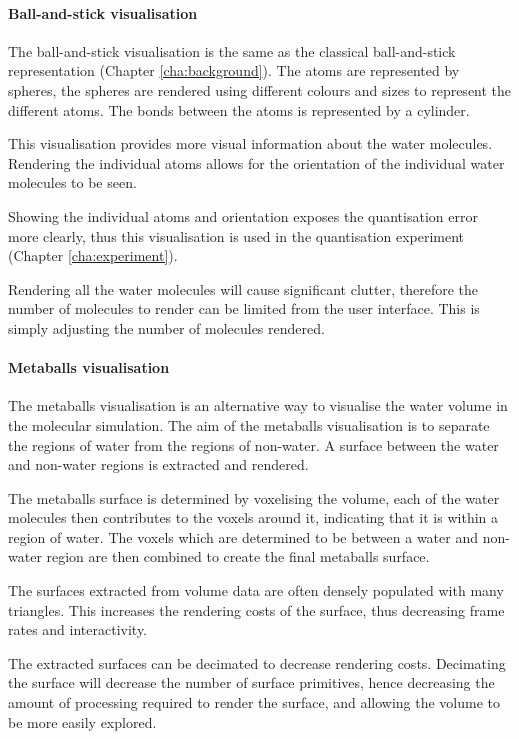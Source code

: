 
\paragraph{Ball-and-stick visualisation}

The ball-and-stick visualisation is the same as the classical ball-and-stick
representation (Chapter \ref{cha:background}). The atoms are represented by
spheres, the spheres are rendered using different colours and sizes to
represent the different atoms. The bonds between the atoms is represented by a
cylinder.

This visualisation provides more visual information about the water molecules.
Rendering the individual atoms allows for the orientation of the individual
water molecules to be seen.

Showing the individual atoms and orientation exposes the quantisation error
more clearly, thus this visualisation is used in the quantisation experiment
(Chapter \ref{cha:experiment}).

Rendering all the water molecules will cause significant clutter, therefore the
number of molecules to render can be limited from the user interface. This is
simply adjusting the number of molecules rendered.


\paragraph{Metaballs visualisation}

The metaballs visualisation is an alternative way to visualise the water volume
in the molecular simulation. The aim of the metaballs visualisation is to
separate the regions of water from the regions of non-water. A surface between
the water and non-water regions is extracted and rendered.

The metaballs surface is determined by voxelising the volume, each of the water
molecules then contributes to the voxels around it, indicating that it is
within a region of water. The voxels which are determined to be between a water
and non-water region are then combined to create the final metaballs surface.

The surfaces extracted from volume data are often densely populated with many
triangles. This increases the rendering costs of the surface, thus decreasing
frame rates and interactivity.

The extracted surfaces can be decimated to decrease rendering costs. Decimating
the surface will decrease the number of surface primitives, hence decreasing
the amount of processing required to render the surface, and allowing the
volume to be more easily explored.

